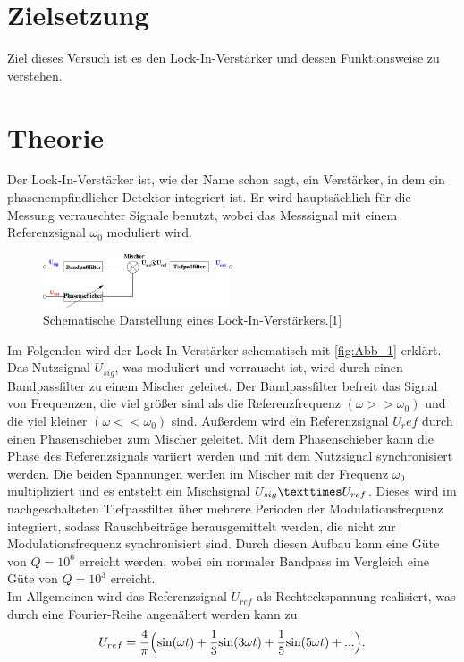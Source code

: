 \section{Zielsetzung}
\label{sec:Zielsetzung}
Ziel dieses Versuch ist es den Lock-In-Verstärker und dessen Funktionsweise zu verstehen.

\section{Theorie}
\label{sec:Theorie}
 Der Lock-In-Verstärker ist, wie der Name schon sagt, ein Verstärker, in dem ein phasenempfindlicher Detektor integriert ist.
 Er wird hauptsächlich für die Messung verrauschter Signale benutzt, wobei das Messsignal mit einem Referenzsignal $\omega_0$ moduliert wird.
 \begin{figure}[H]
    \centering
    \includegraphics[width=0.5\textwidth]{build/Abb_1.pdf}
    \caption {Schematische Darstellung eines Lock-In-Verstärkers.[1]\cite{V303}}
    \label{fig:Abb_1}
\end{figure}
Im Folgenden wird der Lock-In-Verstärker schematisch mit \autoref{fig:Abb_1} erklärt.
Das Nutzsignal $U_{sig}$, was moduliert und verrauscht ist, wird durch einen Bandpassfilter zu einem Mischer geleitet.
Der Bandpassfilter befreit das Signal von Frequenzen, die viel größer sind als die Referenzfrequenz $(\omega >> \omega_0)$ und die viel kleiner $(\omega << \omega_0)$ sind.
Außerdem wird ein Referenzsignal $U_ref$ durch einen Phasenschieber zum Mischer geleitet.
Mit dem Phasenschieber kann die Phase des Referenzsignals variiert werden und mit dem Nutzsignal synchronisiert werden.
Die beiden Spannungen werden im Mischer mit der Frequenz $\omega_0$ multipliziert und es entsteht ein Mischsignal $U_{sig} \texttimes U_{ref}$.
Dieses wird im nachgeschalteten Tiefpassfilter über mehrere Perioden der Modulationsfrequenz integriert, sodass Rauschbeiträge herausgemittelt werden, die nicht zur Modulationsfrequenz synchronisiert sind.
Durch diesen Aufbau kann eine Güte von $Q = 10^6$ erreicht werden, wobei ein normaler Bandpass im Vergleich eine Güte von $Q=10^3$ erreicht.\\
Im Allgemeinen wird das Referenzsignal $U_{ref}$ als Rechteckspannung realisiert, was durch eine Fourier-Reihe angenähert werden kann zu
\begin{equation}
    U_{ref} =\frac{4}{\pi}\Bigl( \text{sin}(\omega t) + \frac{1}{3}\text{sin}(3\omega t) + \frac{1}{5}\text{sin}(5\omega t) + ... \Bigr).
    \label{eqn:Referenzsignal}
\end{equation}
